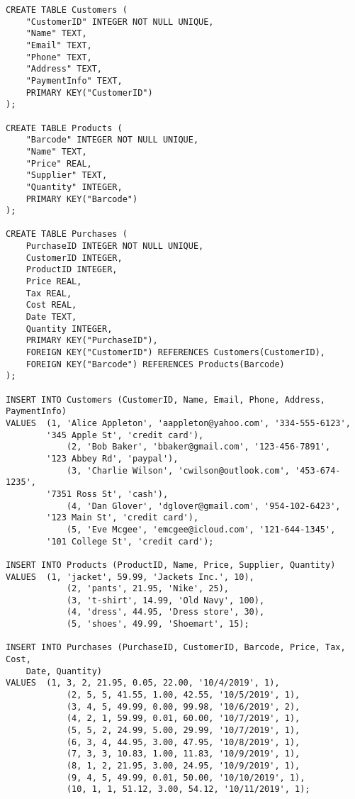 \documentclass[notitlepage,11pt]{report}
\begin{document}
\Suppressnumber
\begin{lstlisting}
CREATE TABLE Customers (
	"CustomerID" INTEGER NOT NULL UNIQUE,
	"Name" TEXT,
	"Email" TEXT,
	"Phone" TEXT,
	"Address" TEXT,
	"PaymentInfo" TEXT,
	PRIMARY KEY("CustomerID")
);

CREATE TABLE Products (
	"Barcode" INTEGER NOT NULL UNIQUE,
	"Name" TEXT,
	"Price" REAL,
	"Supplier" TEXT,
	"Quantity" INTEGER,
	PRIMARY KEY("Barcode")
);

CREATE TABLE Purchases (
	PurchaseID INTEGER NOT NULL UNIQUE,
	CustomerID INTEGER,
	ProductID INTEGER,
	Price REAL,
	Tax REAL,
	Cost REAL,
	Date TEXT,
	Quantity INTEGER,
	PRIMARY KEY("PurchaseID"),
	FOREIGN KEY("CustomerID") REFERENCES Customers(CustomerID),
	FOREIGN KEY("Barcode") REFERENCES Products(Barcode)
);

INSERT INTO Customers (CustomerID, Name, Email, Phone, Address, PaymentInfo)
VALUES	(1, 'Alice Appleton', 'aappleton@yahoo.com', '334-555-6123', 
		'345 Apple St', 'credit card'),
			(2, 'Bob Baker', 'bbaker@gmail.com', '123-456-7891', 
		'123 Abbey Rd', 'paypal'),
			(3, 'Charlie Wilson', 'cwilson@outlook.com', '453-674-1235', 
		'7351 Ross St', 'cash'),
			(4, 'Dan Glover', 'dglover@gmail.com', '954-102-6423', 
		'123 Main St', 'credit card'),
			(5, 'Eve Mcgee', 'emcgee@icloud.com', '121-644-1345', 
		'101 College St', 'credit card');

INSERT INTO Products (ProductID, Name, Price, Supplier, Quantity)
VALUES	(1, 'jacket', 59.99, 'Jackets Inc.', 10),
			(2, 'pants', 21.95, 'Nike', 25),
			(3, 't-shirt', 14.99, 'Old Navy', 100),
			(4, 'dress', 44.95, 'Dress store', 30),
			(5, 'shoes', 49.99, 'Shoemart', 15);

INSERT INTO Purchases (PurchaseID, CustomerID, Barcode, Price, Tax, Cost, 
	Date, Quantity)
VALUES	(1, 3, 2, 21.95, 0.05, 22.00, '10/4/2019', 1),
			(2, 5, 5, 41.55, 1.00, 42.55, '10/5/2019', 1),
			(3, 4, 5, 49.99, 0.00, 99.98, '10/6/2019', 2),
			(4, 2, 1, 59.99, 0.01, 60.00, '10/7/2019', 1),
			(5, 5, 2, 24.99, 5.00, 29.99, '10/7/2019', 1),
			(6, 3, 4, 44.95, 3.00, 47.95, '10/8/2019', 1),
			(7, 3, 3, 10.83, 1.00, 11.83, '10/9/2019', 1),
			(8, 1, 2, 21.95, 3.00, 24.95, '10/9/2019', 1),
			(9, 4, 5, 49.99, 0.01, 50.00, '10/10/2019', 1),
			(10, 1, 1, 51.12, 3.00, 54.12, '10/11/2019', 1);
\end{lstlisting}
\end{document}
